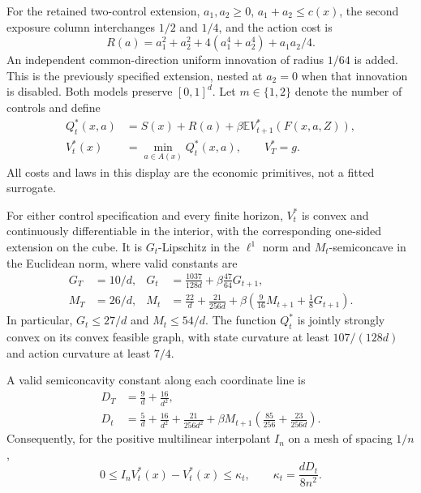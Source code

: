 For the retained two-control extension, $a_1,a_2\ge0$, $a_1+a_2\le c(x)$, the second exposure column interchanges $1/2$ and $1/4$, and the action cost is
\[
 R(a)=a_1^2+a_2^2+4(a_1^4+a_2^4)+a_1a_2/4.
\]
An independent common-direction uniform innovation of radius $1/64$ is added. This is the previously specified extension, nested at $a_2=0$ when that innovation is disabled. Both models preserve $[0,1]^d$. Let $m\in\{1,2\}$ denote the number of controls and define
\begin{align*}
 Q_t^*(x,a)&=S(x)+R(a)+\beta\mathbb E V_{t+1}^*(F(x,a,Z)),\\
 V_t^*(x)&=\min_{a\in A(x)}Q_t^*(x,a),\qquad V_T^*=g.
\end{align*}
All costs and laws in this display are the economic primitives, not a fitted surrogate.

\begin{theorem}\label{thm:regularity62}
For either control specification and every finite horizon, $V_t^*$ is convex and continuously differentiable in the interior, with the corresponding one-sided extension on the cube. It is $G_t$-Lipschitz in the $\ell^1$ norm and $M_t$-semiconcave in the Euclidean norm, where valid constants are
\begin{align*}
 G_T&=10/d,&G_t&=\frac{1037}{128d}+\beta\frac{47}{64}G_{t+1},\\
 M_T&=26/d,&M_t&=\frac{22}{d}+\frac{21}{256d}
             +\beta\left(\frac9{16}M_{t+1}+\frac18G_{t+1}\right).
\end{align*}
In particular, $G_t\le27/d$ and $M_t\le54/d$. The function $Q_t^*$ is jointly strongly convex on its convex feasible graph, with state curvature at least $107/(128d)$ and action curvature at least $7/4$.

A valid semiconcavity constant along each coordinate line is
\begin{align*}
 D_T&=\frac9d+\frac{16}{d^2},\\
 D_t&=\frac5d+\frac{16}{d^2}+\frac{21}{256d^2}
 +\beta M_{t+1}\left(\frac{85}{256}+\frac{23}{256d}\right).
\end{align*}
Consequently, for the positive multilinear interpolant $I_n$ on a mesh of spacing $1/n$,
\begin{equation}\label{eq:interpolation62}
 0\le I_nV_t^*(x)-V_t^*(x)\le\kappa_t,
 \qquad \kappa_t=\frac{dD_t}{8n^2}.
\end{equation}
\end{theorem}

